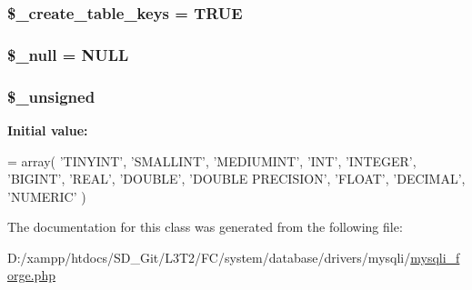 \subsubsection[{\$\+\_\+create\+\_\+table\+\_\+keys}]{\setlength{\rightskip}{0pt plus 5cm}\$\+\_\+create\+\_\+table\+\_\+keys = T\+R\+U\+E\hspace{0.3cm}{\ttfamily [protected]}}\label{class_c_i___d_b__mysqli__forge_a73e07acdd35c948ad353903c2827af6e}
\hypertarget{class_c_i___d_b__mysqli__forge_ae58fe6a5104d4a069a49b27533ce808f}{}
\subsubsection[{\$\+\_\+null}]{\setlength{\rightskip}{0pt plus 5cm}\$\+\_\+null = \textquotesingle{}N\+U\+L\+L\textquotesingle{}\hspace{0.3cm}{\ttfamily [protected]}}\label{class_c_i___d_b__mysqli__forge_ae58fe6a5104d4a069a49b27533ce808f}
\hypertarget{class_c_i___d_b__mysqli__forge_aae977ae6d61fa183f0b25422b6ddc31c}{}
\subsubsection[{\$\+\_\+unsigned}]{\setlength{\rightskip}{0pt plus 5cm}\$\+\_\+unsigned\hspace{0.3cm}{\ttfamily [protected]}}\label{class_c_i___d_b__mysqli__forge_aae977ae6d61fa183f0b25422b6ddc31c}
{\bfseries Initial value\+:}
\begin{DoxyCode}
= array(
        \textcolor{stringliteral}{'TINYINT'},
        \textcolor{stringliteral}{'SMALLINT'},
        \textcolor{stringliteral}{'MEDIUMINT'},
        \textcolor{stringliteral}{'INT'},
        \textcolor{stringliteral}{'INTEGER'},
        \textcolor{stringliteral}{'BIGINT'},
        \textcolor{stringliteral}{'REAL'},
        \textcolor{stringliteral}{'DOUBLE'},
        \textcolor{stringliteral}{'DOUBLE PRECISION'},
        \textcolor{stringliteral}{'FLOAT'},
        \textcolor{stringliteral}{'DECIMAL'},
        \textcolor{stringliteral}{'NUMERIC'}
    )
\end{DoxyCode}


The documentation for this class was generated from the following file\+:\begin{DoxyCompactItemize}
\item 
D\+:/xampp/htdocs/\+S\+D\+\_\+\+Git/\+L3\+T2/\+F\+C/system/database/drivers/mysqli/\hyperlink{mysqli__forge_8php}{mysqli\+\_\+forge.\+php}\end{DoxyCompactItemize}

